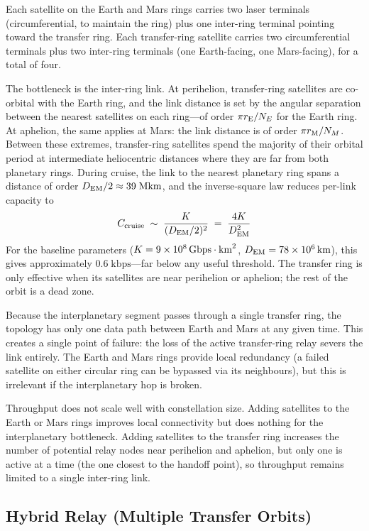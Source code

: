 Each satellite on the Earth and Mars rings carries two laser terminals
(circumferential, to maintain the ring) plus one inter-ring terminal pointing
toward the transfer ring. Each transfer-ring satellite carries two circumferential
terminals plus two inter-ring terminals (one Earth-facing, one Mars-facing),
for a total of four.

The bottleneck is the inter-ring link. At perihelion, transfer-ring satellites are
co-orbital with the Earth ring, and the link distance is set by the angular
separation between the nearest satellites on each ring---of order $\pi r_{\mathrm{E}} / N_E$
for the Earth ring. At aphelion, the same applies at Mars: the link distance is of
order $\pi r_{\mathrm{M}} / N_M$. Between these extremes, transfer-ring satellites spend the
majority of their orbital period at intermediate heliocentric distances where they
are far from both planetary rings. During cruise, the link to the nearest planetary
ring spans a distance of order $D_{\mathrm{EM}} / 2 \approx 39\;\text{Mkm}$, and the
inverse-square law reduces per-link capacity to
%
\begin{equation}\label{eq:hohmann-cruise}
  C_{\text{cruise}} \;\sim\; \frac{K}{(D_{\mathrm{EM}}/2)^2}
  \;=\; \frac{4K}{D_{\mathrm{EM}}^2}
\end{equation}
%
For the baseline parameters ($K = 9 \times 10^{8}\,\text{Gbps}\cdot\text{km}^2$,
$D_{\mathrm{EM}} = 78 \times 10^{6}\,\text{km}$), this gives approximately $0.6\;\text{kbps}$---far
below any useful threshold. The transfer ring is only effective when its satellites
are near perihelion or aphelion; the rest of the orbit is a dead zone.

Because the interplanetary segment passes through a single transfer ring, the
topology has only one data path between Earth and Mars at any given time. This
creates a single point of failure: the loss of the active transfer-ring relay
severs the link entirely. The Earth and Mars rings provide local redundancy (a
failed satellite on either circular ring can be bypassed via its neighbours), but
this is irrelevant if the interplanetary hop is broken.

Throughput does not scale well with constellation size. Adding satellites to the
Earth or Mars rings improves local connectivity but does nothing for the
interplanetary bottleneck. Adding satellites to the transfer ring increases the
number of potential relay nodes near perihelion and aphelion, but only one is
active at a time (the one closest to the handoff point), so throughput remains
limited to a single inter-ring link.


\subsection{Hybrid Relay (Multiple Transfer Orbits)}
\label{sec:topo-hybrid}

